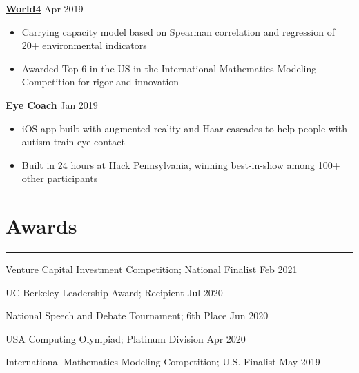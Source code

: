 \documentclass[11pt]{article}
\newcommand{\resumesection}[1]{\vspace{-0.6cm}\section*{\color{highlight}#1}\vspace{-0.3cm}\hrule\vspace{0.2cm}}
\begin{document}
\textbf{\href{https://github.com/gautomdas/IMMC-World4/blob/master/US-9365.pdf}{World4}} \hfill Apr 2019\par
\begin{itemize}
	\item Carrying capacity model based on Spearman correlation and regression of 20+ environmental indicators
	\item Awarded Top 6 in the US in the International Mathematics Modeling Competition for rigor and innovation
\end{itemize}\vspace{0.1cm} \par

\textbf{\href{https://github.com/gautomdas/eye-coach}{Eye Coach}} \hfill Jan 2019 \par
\begin{itemize}
	\item iOS app built with augmented reality and Haar cascades to help people with autism train eye contact
	\item Built in 24 hours at Hack Pennsylvania, winning best-in-show among 100+ other participants
\end{itemize}\vspace{0.1cm} \par

\resumesection{Awards}

Venture Capital Investment Competition; National Finalist \hfill Feb 2021\par
UC Berkeley Leadership Award; Recipient \hfill Jul 2020 \par
National Speech and Debate Tournament; 6th Place \hfill Jun 2020 \par
USA Computing Olympiad; Platinum Division \hfill Apr 2020 \par
International Mathematics Modeling Competition; U.S. Finalist \hfill May 2019\par
\end{document}
